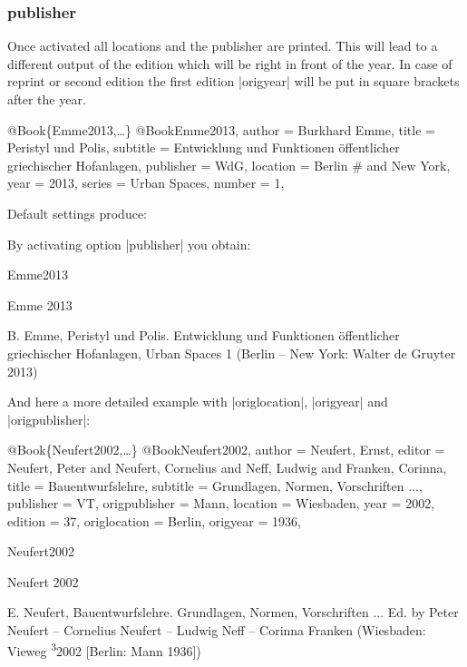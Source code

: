 \documentclass[a4paper,
10pt,
greek,
french,
spanish,
italian,
ngerman,
english
]{ltxdoc}
\begin{document}
\subsubsection{publisher}\label{publisher}
Once activated all locations and the publisher are printed. 
This will lead to a different output of the edition which will be right in front of the year.
In case of reprint or second edition the first edition |origyear| will be put in square brackets after the year.

\begin{bibexample}[label=Emme2013]{{@}Book\{Emme2013,…\}}
@Book{Emme2013,
  author    = {Burkhard Emme},
  title     = {Peristyl und Polis},
  subtitle  = {Entwicklung und Funktionen öffentlicher griechischer Hofanlagen},
  publisher = WdG,
  location  = Berlin #{ and New York}, %
  year      = {2013},
  series    = {Urban Spaces},
  number    = {1},
}
\end{bibexample}
\begin{refsection}\end{refsection}

Default settings produce:
 
By activating option |publisher| you obtain:

\begin{bibbox}{Emme2013}\footnotesize
\parbox[t]{1.7cm}{Emme 2013} \parbox[t]{9.4cm}{B. Emme, Peristyl und Polis. Entwicklung und Funktionen öffentlicher griechischer Hofanlagen, Urban Spaces 1 (Berlin {\color{red} – New York: Walter de Gruyter} 2013)}
\end{bibbox}
 
And here a more detailed example with |origlocation|, |origyear| and |origpublisher|:
\begin{bibexample}[label=Neufert2002]{{@}Book\{Neufert2002,…\}}
@Book{Neufert2002,
  author       = {Neufert, Ernst},
  editor       = {Neufert, Peter and Neufert, Cornelius and Neff, Ludwig and Franken, Corinna},
  title        = {Bauentwurfslehre},
  subtitle     = {Grundlagen, Normen, Vorschriften ...},
  publisher    = VT, %
  origpublisher = {Mann},
  location     = {Wiesbaden},
  year         = {2002},
  edition      = {37},
  origlocation = Berlin, %
  origyear     = {1936},
}
\end{bibexample}
 

\begin{bibbox}{Neufert2002}\footnotesize
\parbox[t]{1.7cm}{Neufert  2002} \parbox[t]{9.4cm}{%
E. Neufert, Bauentwurfslehre. Grundlagen, Normen, Vorschriften ... Ed. by Peter Neufert – Cornelius Neufert – Ludwig Neff  – Corinna Franken {\color{red} (Wiesbaden: Vieweg \textsuperscript{3}2002 [Berlin: Mann 1936])}}
\end{bibbox}
 
\end{document}
